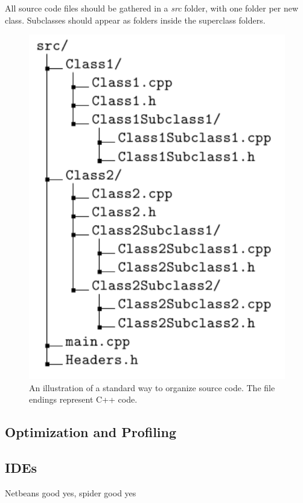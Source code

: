 All source code files should be gathered in a \textit{src} folder, with one folder per new class. Subclasses should appear as folders inside the superclass folders. 

\begin{figure}
 \label{FIG:SRCdirTree}
 \begin{center}
  \includegraphics[scale=0.6]{../Graphics/SRCfolderStruct.pdf} 
 \end{center}
 \caption{An illustration of a standard way to organize source code. The file endings represent C++ code.}
\end{figure}


\subsection{Optimization and Profiling}

\subsection{IDEs}

Netbeans good yes, spider good yes